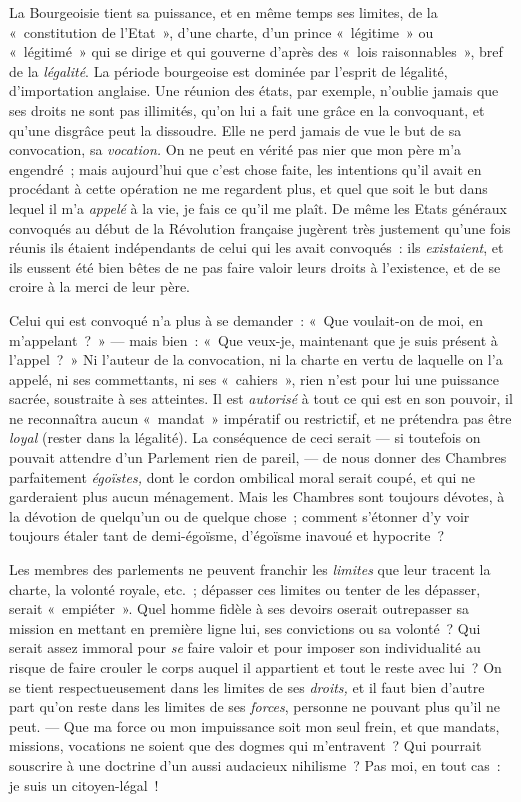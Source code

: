 \documentclass[french,twoside]{book} %
\begin{document}
La Bourgeoisie tient sa puissance, et en même temps ses limites, de la « constitution de l’Etat », d’une charte, d’un prince « légitime » ou « légitimé » qui se dirige et qui gouverne d’après des « lois raisonnables », bref de la \emph{légalité}. La période bourgeoise est dominée par l’esprit de légalité, d’importation anglaise. Une réunion des états, par exemple, n’oublie jamais que ses droits ne sont pas illimités, qu’on lui a fait une grâce en la convoquant, et qu’une disgrâce peut la dissoudre. Elle ne perd jamais de vue le but de sa convocation, sa \emph{vocation.} On ne peut en vérité pas nier que mon père m’a engendré ; mais aujourd’hui que c’est chose faite, les intentions qu’il avait en procédant à cette opération ne me regardent plus, et quel que soit le but dans lequel il m’a \emph{appelé} à la vie, je fais ce qu’il me plaît. De même les Etats généraux convoqués au début de la Révolution française jugèrent très justement qu’une fois réunis ils étaient indépendants de celui qui les avait convoqués : ils \emph{existaient}, et ils eussent été bien bêtes de ne pas faire valoir leurs droits à l’existence, et de se croire à la merci de leur père.\par
Celui qui est convoqué n’a plus à se demander : « Que voulait-on de moi, en m’appelant ? » — mais bien : « Que veux-je, maintenant que je suis présent à l’appel ? » Ni l’auteur de la convocation, ni la charte en vertu de laquelle on l’a appelé, ni ses commettants, ni ses « cahiers », rien n’est pour lui une puissance sacrée, soustraite à ses atteintes. Il est \emph{autorisé }à tout ce qui est en son pouvoir, il ne reconnaîtra aucun « mandat » impératif ou restrictif, et ne prétendra pas être \emph{loyal} (rester dans la légalité). La conséquence de ceci serait — si toutefois on pouvait attendre d’un  Parlement rien de pareil, — de nous donner des Chambres parfaitement \emph{égoïstes,} dont le cordon ombilical moral serait coupé, et qui ne garderaient plus aucun ménagement. Mais les Chambres sont toujours dévotes, à la dévotion de quelqu’un ou de quelque chose ; comment s’étonner d’y voir toujours étaler tant de demi-égoïsme, d’égoïsme inavoué et hypocrite ?\par
Les membres des parlements ne peuvent franchir les \emph{limites} que leur tracent la charte, la volonté royale, etc. ; dépasser ces limites ou tenter de les dépasser, serait « empiéter ». Quel homme fidèle à ses devoirs oserait outrepasser sa mission en mettant en première ligne lui, ses convictions ou sa volonté ? Qui serait assez immoral pour \emph{se} faire valoir et pour imposer son individualité au risque de faire crouler le corps auquel il appartient et tout le reste avec lui ? On se tient respectueusement dans les limites de ses \emph{droits, }et il faut bien d’autre part qu’on reste dans les limites de ses \emph{forces}, personne ne pouvant plus qu’il ne peut. — Que ma force ou mon impuissance soit mon seul frein, et que mandats, missions, vocations ne soient que des dogmes qui m’entravent ? Qui pourrait souscrire à une doctrine d’un aussi audacieux nihilisme ? Pas moi, en tout cas : je suis un citoyen-légal !\par
\end{document}
